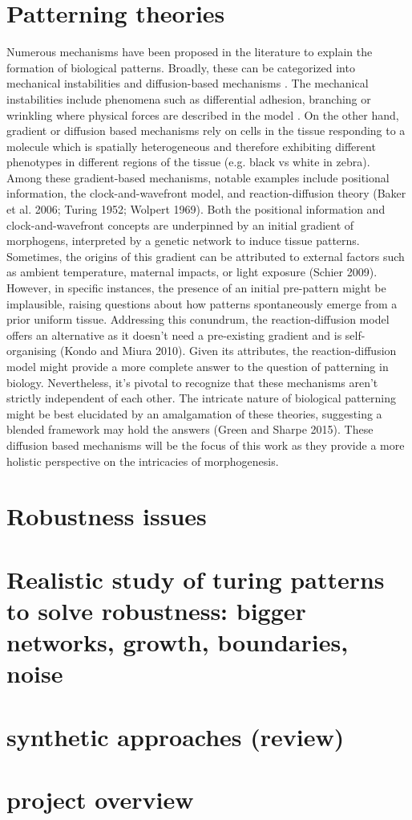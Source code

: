 \section{Patterning theories}
Numerous mechanisms have been proposed in the literature to explain the formation of biological patterns.
Broadly, these can be categorized into mechanical instabilities and diffusion-based mechanisms \autocite{kosmrlj2020}.
The mechanical instabilities include phenomena such as differential adhesion, branching or wrinkling where physical forces are described in the model \cite{Scholes2017}.
On the other hand, gradient or diffusion based mechanisms rely on cells in the tissue responding to a molecule which is spatially heterogeneous and therefore exhibiting different phenotypes in different regions of the tissue (e.g. black vs white in zebra).\\

Among these gradient-based mechanisms, notable examples include positional information, the clock-and-wavefront model, and reaction-diffusion theory (Baker et al. 2006; Turing 1952; Wolpert 1969).
Both the positional information and clock-and-wavefront concepts are underpinned by an initial gradient of morphogens, interpreted by a genetic network to induce tissue patterns. Sometimes, the origins of this gradient can be attributed to external factors such as ambient temperature, maternal impacts, or light exposure (Schier 2009).
However, in specific instances, the presence of an initial pre-pattern might be implausible, raising questions about how patterns spontaneously emerge from a prior uniform tissue.
Addressing this conundrum, the reaction-diffusion model offers an alternative as it doesn't need a pre-existing gradient and is self-organising (Kondo and Miura 2010). Given its attributes, the reaction-diffusion model might provide a more complete answer to the question of patterning in biology. Nevertheless, it's pivotal to recognize that these mechanisms aren't strictly independent of each other. The intricate nature of biological patterning might be best elucidated by an amalgamation of these theories, suggesting a blended framework may hold the answers (Green and Sharpe 2015).
These diffusion based mechanisms will be the focus of this work as they provide a more holistic perspective on the intricacies of morphogenesis.

\section{Robustness issues}

\section{Realistic study of turing patterns to solve robustness: bigger networks, growth, boundaries, noise}
\section{ synthetic approaches (review)}

\section{project overview}

